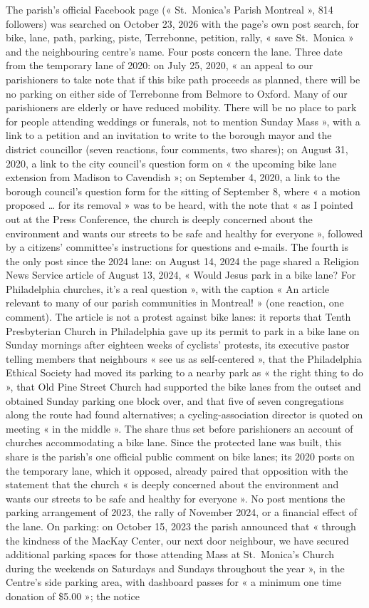 \documentclass[11pt,letterpaper]{article}
\begin{document}
The parish's official Facebook page (« St.~Monica's Parish Montreal », 814 followers) was searched on October 23, 2026 with the page's own post search, for bike, lane, path, parking, piste, Terrebonne, petition, rally, « save St.~Monica » and the neighbouring centre's name. Four posts concern the lane. Three date from the temporary lane of 2020: on July 25, 2020, « an appeal to our parishioners to take note that if this bike path proceeds as planned, there will be no parking on either side of Terrebonne from Belmore to Oxford. Many of our parishioners are elderly or have reduced mobility. There will be no place to park for people attending weddings or funerals, not to mention Sunday Mass », with a link to a petition and an invitation to write to the borough mayor and the district councillor (seven reactions, four comments, two shares); on August 31, 2020, a link to the city council's question form on « the upcoming bike lane extension from Madison to Cavendish »; on September 4, 2020, a link to the borough council's question form for the sitting of September 8, where « a motion proposed … for its removal » was to be heard, with the note that « as I pointed out at the Press Conference, the church is deeply concerned about the environment and wants our streets to be safe and healthy for everyone », followed by a citizens' committee's instructions for questions and e-mails. The fourth is the only post since the 2024 lane: on August 14, 2024 the page shared a Religion News Service article of August 13, 2024, « Would Jesus park in a bike lane? For Philadelphia churches, it's a real question », with the caption « An article relevant to many of our parish communities in Montreal! » (one reaction, one comment). The article is not a protest against bike lanes: it reports that Tenth Presbyterian Church in Philadelphia gave up its permit to park in a bike lane on Sunday mornings after eighteen weeks of cyclists' protests, its executive pastor telling members that neighbours « see us as self-centered », that the Philadelphia Ethical Society had moved its parking to a nearby park as « the right thing to do », that Old Pine Street Church had supported the bike lanes from the outset and obtained Sunday parking one block over, and that five of seven congregations along the route had found alternatives; a cycling-association director is quoted on meeting « in the middle ». The share thus set before parishioners an account of churches accommodating a bike lane. Since the protected lane was built, this share is the parish's one official public comment on bike lanes; its 2020 posts on the temporary lane, which it opposed, already paired that opposition with the statement that the church « is deeply concerned about the environment and wants our streets to be safe and healthy for everyone ». No post mentions the parking arrangement of 2023, the rally of November 2024, or a financial effect of the lane. On parking: on October 15, 2023 the parish announced that « through the kindness of the MacKay Center, our next door neighbour, we have secured additional parking spaces for those attending Mass at St.~Monica's Church during the weekends on Saturdays and Sundays throughout the year », in the Centre's side parking area, with dashboard passes for « a minimum one time donation of \$5.00 »; the notice 
\end{document}
